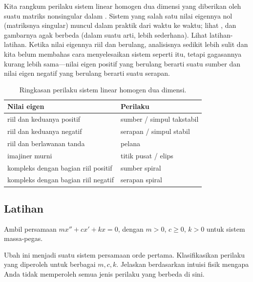 \medskip

Kita rangkum perilaku sistem linear homogen dua dimensi
yang diberikan oleh suatu matriks nonsingular
dalam .
Sistem yang salah satu nilai eigennya nol (matriksnya singular)
muncul dalam praktik dari waktu ke waktu; lihat
, dan gambarnya agak
berbeda (dalam suatu arti, lebih sederhana).  Lihat latihan-latihan.
Ketika nilai eigennya riil dan berulang, 
analisisnya sedikit lebih sulit dan kita belum
membahas cara menyelesaikan sistem seperti itu, tetapi
gagasannya kurang lebih sama---nilai eigen positif yang berulang
berarti suatu sumber dan nilai eigen negatif yang berulang
berarti suatu serapan.


\begin{table}[h!t]
\mybeginframe
\capstart
\begin{center}
\begin{tabular}{@{}ll@{}}
\toprule
Nilai eigen & Perilaku \\
\midrule
riil dan keduanya positif & sumber / simpul takstabil \\
riil dan keduanya negatif & serapan / simpul stabil \\
riil dan berlawanan tanda & pelana \\
imajiner murni & titik pusat / elips \\
kompleks dengan bagian riil positif & sumber spiral \\
kompleks dengan bagian riil negatif & serapan spiral \\
\bottomrule
\end{tabular}
\end{center}
\caption{Ringkasan perilaku sistem linear homogen dua dimensi.\label{pln:behtab}}
\myendframe
\end{table}

\subsection{Latihan}

\begin{exercise}
Ambil persamaan $m x'' + c x' + kx = 0$, dengan $m > 0$, $c \geq 0$, $k > 0$
untuk sistem massa-pegas.
\begin{tasks}
\task Ubah ini menjadi suatu sistem persamaan orde pertama.
\task Klasifikasikan perilaku yang diperoleh untuk berbagai $m, c, k$.
\task Jelaskan berdasarkan intuisi fisik mengapa Anda tidak memperoleh semua
jenis perilaku yang berbeda di sini.
\end{tasks}
\end{exercise}

